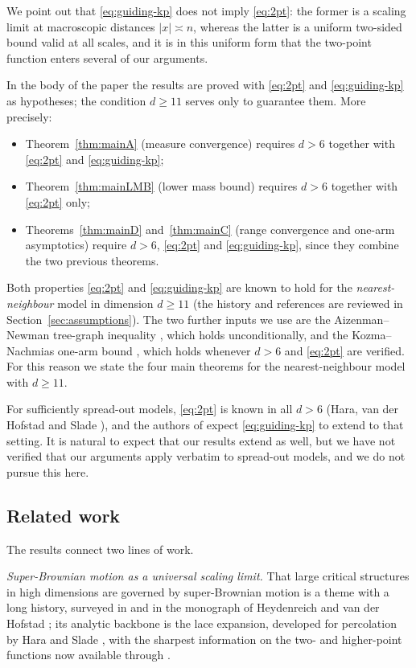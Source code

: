 \documentclass[11pt]{article}
\theoremstyle{definition}
\theoremstyle{remark}
\numberwithin{equation}{section}
\theoremstyle{plain}
\theoremstyle{definition}
\theoremstyle{remark}
\theoremstyle{plain}
\begin{document}
We point out that \eqref{eq:guiding-kp} does not imply \eqref{eq:2pt}: the
former is a scaling limit at macroscopic distances $|x|\asymp n$, whereas the
latter is a uniform two-sided bound valid at all scales, and it is in this
uniform form that the two-point function enters several of our arguments.

In the body of the paper the results are proved with \eqref{eq:2pt} and
\eqref{eq:guiding-kp} as hypotheses; the condition $d\ge 11$ serves only to
guarantee them. More precisely:
\begin{itemize}
\item Theorem~\ref{thm:mainA} (measure convergence) requires $d>6$ together
with \eqref{eq:2pt} and \eqref{eq:guiding-kp};
\item Theorem~\ref{thm:mainLMB} (lower mass bound) requires $d>6$ together
with \eqref{eq:2pt} only;
\item Theorems~\ref{thm:mainD} and~\ref{thm:mainC} (range convergence and
one-arm asymptotics) require $d>6$, \eqref{eq:2pt} and \eqref{eq:guiding-kp},
since they combine the two previous theorems.
\end{itemize}

Both properties \eqref{eq:2pt} and \eqref{eq:guiding-kp} are known to hold for the \emph{nearest-neighbour} model in
dimension $d\ge 11$ (the history and references are reviewed in
Section~\ref{sec:assumptions}).
The two further inputs we
use are the Aizenman--Newman tree-graph inequality \cite{AN84}, which holds
unconditionally, and the Kozma--Nachmias one-arm bound \cite{KN11}, which
holds whenever $d>6$ and \eqref{eq:2pt} are verified. For this reason we state
the four main theorems for the nearest-neighbour model with $d\ge 11$.


For sufficiently spread-out models, \eqref{eq:2pt} is known in all $d>6$
(Hara, van der Hofstad and Slade \cite{HHS03}), and the authors of \cite{CCHS26}
expect \eqref{eq:guiding-kp} to extend to that setting. It
is natural to expect that our results extend as well, but we have not verified
that our arguments apply verbatim to spread-out models, and we do not pursue
this here.

\subsection{Related work}\label{sec:related}

The results connect two lines of work.

\emph{Super-Brownian motion as a universal scaling limit.} That large critical
structures in high dimensions are governed by super-Brownian motion is a theme
with a long history, surveyed in \cite{Sla99} and in the monograph of
Heydenreich and van der Hofstad \cite{HvdH17}; its analytic
backbone is the lace expansion, developed for percolation by Hara and Slade
\cite{HS90,HS00a,HS00b}, with the sharpest information on the two- and
higher-point functions now available through
\cite{CCHS26,FH17,Har08,HHS03}.
\end{document}
